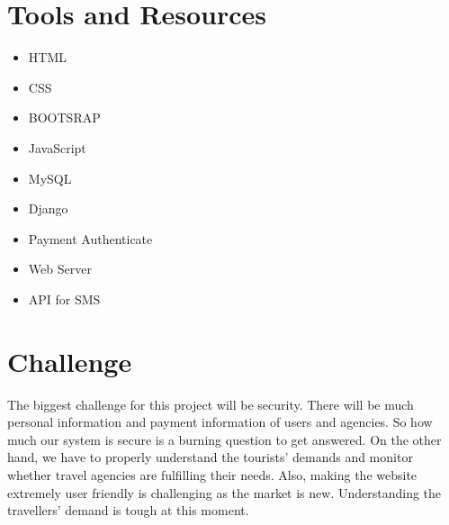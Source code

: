 \documentclass[12pt,a4paper,twoside,openright]{report}
\begin{document}
\section*{Tools and Resources}
\begin{itemize}
\item HTML
\item CSS
\item BOOTSRAP
\item JavaScript
\item MySQL
\item Django
\item Payment Authenticate 
\item Web Server
\item API for SMS

\end{itemize}  



\section*{Challenge}
The biggest challenge for this project will be security. There will be much personal information and payment information of users and agencies. So how much our system is secure is a burning question to get answered. On the other hand, we have to properly understand the tourists' demands and monitor whether travel agencies are fulfilling their needs. Also, making the website extremely user friendly is challenging as the market is new. Understanding the travellers' demand is tough at this moment. 

\newpage

   
\end{document}
